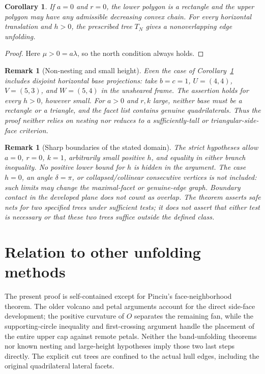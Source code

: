 \documentclass[a4paper,11pt]{amsart}
\newtheorem{corollary}[theorem]{Corollary}
\newtheorem{remark}[theorem]{Remark}
\begin{document}
\begin{corollary}\label{cor:R1}
If $a=0$ and $r=0$, the lower polygon is a rectangle and the upper polygon may have any admissible decreasing convex chain. For every horizontal translation and $h>0$, the prescribed tree $T_N$ gives a nonoverlapping edge unfolding.
\end{corollary}
\begin{proof}
Here $\mu>0=a\lambda$, so the north condition always holds.
\end{proof}

\begin{remark}[Non-nesting and small height]
Even the case of Corollary~\ref{cor:R1} includes disjoint horizontal base projections: take $b=c=1$, $U=(4,4)$, $V=(5,3)$, and $W=(5,4)$ in the unsheared frame. The assertion holds for every $h>0$, however small. For $a>0$ and $r,k$ large, neither base must be a rectangle or a triangle, and the facet list contains genuine quadrilaterals. Thus the proof neither relies on nesting nor reduces to a sufficiently-tall or triangular-side-face criterion.
\end{remark}

\begin{remark}[Sharp boundaries of the stated domain]
The strict hypotheses allow $a=0$, $r=0$, $k=1$, arbitrarily small positive $h$, and equality in either branch inequality. No positive lower bound for $h$ is hidden in the argument. The case $h=0$, an angle $\delta=\pi$, or collapsed/collinear consecutive vertices is not included: such limits may change the maximal-facet or genuine-edge graph. Boundary contact in the developed plane does not count as overlap. The theorem asserts safe nets for two specified trees under sufficient tests; it does not assert that either test is necessary or that these two trees suffice outside the defined class.
\end{remark}

\section{Relation to other unfolding methods}
The present proof is self-contained except for Pinciu's face-neighborhood theorem. The older volcano and petal arguments account for the direct side-face development; the positive curvature of $O$ separates the remaining fan, while the supporting-circle inequality and first-crossing argument handle the placement of the entire upper cap against remote petals. Neither the band-unfolding theorems nor known nesting and large-height hypotheses imply those two last steps directly. The explicit cut trees are confined to the actual hull edges, including the original quadrilateral lateral facets.
\end{document}
